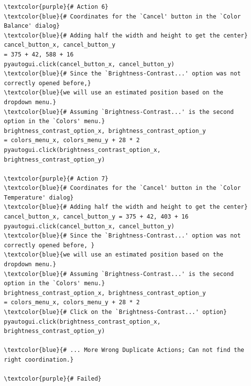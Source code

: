 \begin{tcolorbox}[title={GIMP Task: \textit{Could you tone down the brightness of my photo?}}]
\begin{Verbatim}[commandchars=\\\{\}]
\textcolor{purple}{# Action 6}
\textcolor{blue}{# Coordinates for the `Cancel' button in the `Color Balance' dialog}
\textcolor{blue}{# Adding half the width and height to get the center}
cancel_button_x, cancel_button_y 
= 375 + 42, 588 + 16  
pyautogui.click(cancel_button_x, cancel_button_y)
\textcolor{blue}{# Since the `Brightness-Contrast...' option was not correctly opened before,}
\textcolor{blue}{we will use an estimated position based on the dropdown menu.}
\textcolor{blue}{# Assuming `Brightness-Contrast...' is the second option in the `Colors' menu.}
brightness_contrast_option_x, brightness_contrast_option_y 
= colors_menu_x, colors_menu_y + 28 * 2
pyautogui.click(brightness_contrast_option_x, brightness_contrast_option_y)

\textcolor{purple}{# Action 7}
\textcolor{blue}{# Coordinates for the `Cancel' button in the `Color Temperature' dialog}
\textcolor{blue}{# Adding half the width and height to get the center}
cancel_button_x, cancel_button_y = 375 + 42, 403 + 16  
pyautogui.click(cancel_button_x, cancel_button_y)
\textcolor{blue}{# Since the `Brightness-Contrast...' option was not correctly opened before, }
\textcolor{blue}{we will use an estimated position based on the dropdown menu.}
\textcolor{blue}{# Assuming `Brightness-Contrast...' is the second option in the `Colors' menu.}
brightness_contrast_option_x, brightness_contrast_option_y 
= colors_menu_x, colors_menu_y + 28 * 2
\textcolor{blue}{# Click on the `Brightness-Contrast...' option}
pyautogui.click(brightness_contrast_option_x, brightness_contrast_option_y)

\textcolor{blue}{# ... More Wrong Duplicate Actions; Can not find the right coordination.}

\textcolor{purple}{# Failed}
\end{Verbatim}
\end{tcolorbox}


